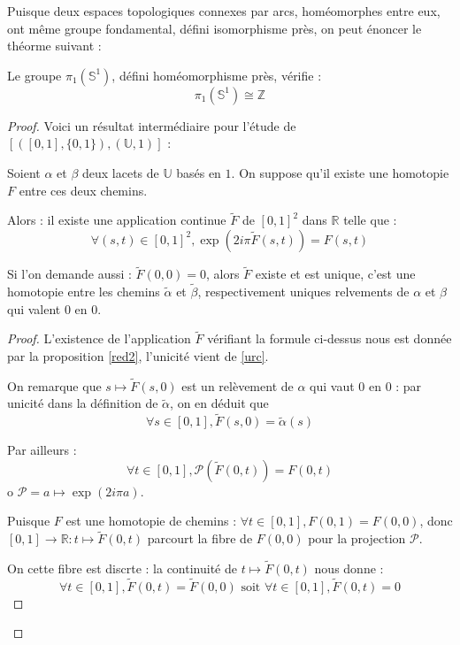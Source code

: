 Puisque deux espaces topologiques connexes par arcs, hom\'eomorphes entre eux, ont m\^eme groupe fondamental, %
d\'efini  isomorphisme pr\`es, on peut \'enoncer le th\'eorme suivant :

\begin{theo}
Le groupe $\pi_1(\mathbb{S}^1)$, d\'efini  hom\'eomorphisme pr\`es, v\'erifie :
\[\pi_1(\mathbb{S}^1)\cong\mathbb{Z}\]
\end{theo}

\begin{proof}
Voici un r\'esultat interm\'ediaire pour l'\'etude de $[([0,1],\{0,1\}),(\mathbb{U},1)]$ :

\begin{lemm}
Soient $\alpha$ et $\beta$ deux lacets de $\mathbb{U}$ bas\'es en $1$. On suppose qu'il existe une homotopie $F$ entre ces deux chemins.

\par
Alors : il existe une application continue $\tilde{F}$ de $[0,1]^2$ dans $\mathbb{R}$ telle que :
\[\forall (s,t)\in[0,1]^2 , \exp(2i\pi \tilde{F}(s,t))=F(s,t)\]

Si l'on demande aussi : $\tilde{F}(0,0)=0$, alors $\tilde{F}$ existe et est unique, %
c'est une homotopie entre les chemins $\tilde{\alpha}$ et $\tilde{\beta}$, %
respectivement uniques relvements de $\alpha$ et $\beta$ qui valent $0$ en $0$.
\end{lemm}

\begin{proof}
L'existence de l'application $\tilde{F}$ v\'erifiant la formule ci-dessus nous est donn\'ee par la proposition \ref{red2}, l'unicit\'e vient de \ref{urc}.

\par
On remarque que $s\mapsto \tilde{F}(s,0)$ est un rel\`evement de $\alpha$ qui vaut $0$ en $0$ : par unicit\'e dans la d\'efinition de $\tilde{\alpha}$, on en d\'eduit que
\[\forall s\in [0,1],\tilde{F}(s,0)=\tilde{\alpha}(s)\]

Par ailleurs :
\[\forall t\in [0,1],\mathcal{P}(\tilde{F}(0,t))=F(0,t)\]
o $\mathcal{P}=a\mapsto\exp (2i\pi a)$.

\par
Puisque $F$ est une homotopie de chemins : $\forall t\in[0,1], F(0,1)=F(0,0)$, %
donc $[0,1]\rightarrow\mathbb{R}:t\mapsto\tilde{F}(0,t)$ parcourt la fibre de $F(0,0)$ pour la projection $\mathcal{P}$.

\par
On cette fibre est discrte : la continuit\'e de $t\mapsto \tilde{F}(0,t)$ nous donne :
\[\forall t\in[0,1],\tilde{F}(0,t)=\tilde{F}(0,0)\text{ soit }\forall t\in[0,1],\tilde{F}(0,t)=0\]


\end{proof}
\end{proof}
